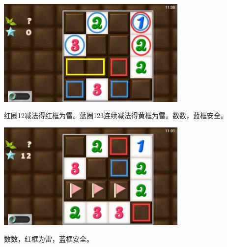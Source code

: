 \subsection{} %
\begin{center}
    \includegraphics[width=0.7\textwidth]{puzzlelow/189-1.jpg}
\end{center}
红圈12减法得红框为雷。蓝圈123连续减法得黄框为雷。数数，蓝框安全。
\begin{center}
    \includegraphics[width=0.7\textwidth]{puzzlelow/189-2.jpg}
\end{center}
数数，红框为雷，蓝框安全。

